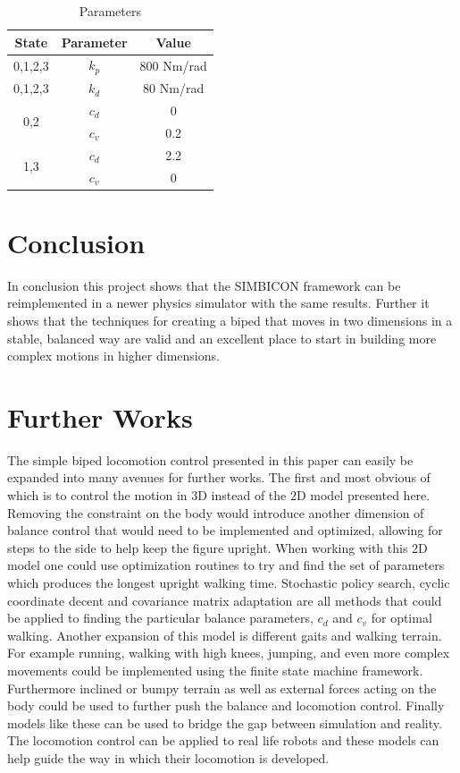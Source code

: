 \documentclass[12pt, a4paper]{article}
\begin{document}
\begin{table}[ht]
\caption{Parameters}
\begin{center}
\begin{tabular}{|c|c|c|}
\hline
State & Parameter & Value \\
\hline
0,1,2,3 & $k_p$ & 800 Nm/rad\\
\hline
0,1,2,3 & $k_d$ & 80 Nm/rad\\
\hline
\multirow{2}{*}{0,2}& $c_d$ & 0\\\cline{2-3}
& $c_v$ & 0.2\\ \cline{2-3}
\hline
\multirow{2}{*}{1,3}& $c_d$ & 2.2\\\cline{2-3}
& $c_v$ & 0\\ \cline{2-3}
\hline
\end{tabular}
\end{center}
\label{tbl:parameters}
\end{table}

\section{Conclusion}

In conclusion this project shows that the SIMBICON framework can be reimplemented in a newer physics simulator with the same results. Further it shows that the techniques for creating a biped that moves in two dimensions in a stable, balanced way are valid and an excellent place to start in building more complex motions in higher dimensions. 
 
\section{Further Works}
The simple biped locomotion control presented in this paper can easily be expanded into many avenues for further works. The first and most obvious of which is to control the motion in 3D instead of the 2D model presented here. Removing the constraint on the body would introduce another dimension of balance control that would need to be implemented and optimized, allowing for steps to the side to help keep the figure upright. When working with this 2D model one could use optimization routines to try and find the set of parameters which produces the longest upright walking time. Stochastic policy search, cyclic coordinate decent and covariance matrix adaptation are all methods that could be applied to finding the particular balance parameters, $c_d$ and $c_v$ for optimal walking. Another expansion of this model is different gaits and walking terrain. For example running, walking with high knees, jumping, and even more complex movements could be implemented using the finite state machine framework. Furthermore inclined or bumpy terrain as well as external forces acting on the body could be used to further push the balance and locomotion control. Finally models like these can be used to bridge the gap between simulation and reality. The locomotion control can be applied to real life robots and these models can help guide the way in which their locomotion is developed. 
\end{document}
